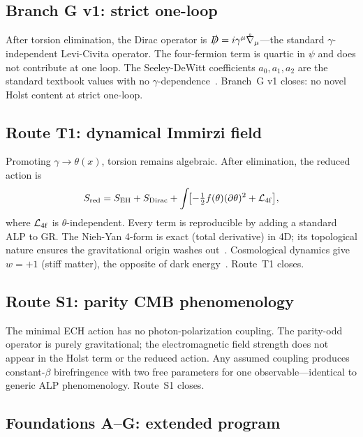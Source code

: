 \documentclass[aps,prd,twocolumn,superscriptaddress,showpacs,preprintnumbers,
  nofootinbib,longbibliography,floatfix]{revtex4-2}
\newcommand{\BI}{\gamma}
\begin{document}
\subsection{Branch G v1: strict one-loop}\label{sec:branchG}

After torsion elimination, the Dirac operator is
$\slashed{D} = i\gamma^\mu\mathring\nabla_\mu$---the standard
$\BI$-independent Levi-Civita operator. The four-fermion term is quartic
in $\psi$ and does not contribute at one loop. The Seeley-DeWitt
coefficients $a_0, a_1, a_2$ are the standard textbook values with no
$\BI$-dependence~\cite{Vassilevich2003}. Branch~G v1 closes: no novel
Holst content at strict one-loop.

\subsection{Route T1: dynamical Immirzi field}\label{sec:T1}

Promoting $\BI \to \theta(x)$, torsion remains algebraic. After
elimination, the reduced action is~\cite{CalcagniMercuri2009,Mercuri2009}
\begin{equation}\label{eq:T1red}
  S_{\rm red} = S_{\rm EH} + S_{\rm Dirac}
  + \int\!\bigl[-\tfrac{1}{2}f(\theta)(\partial\theta)^2
    + \mathcal{L}_{\rm 4f}\bigr],
\end{equation}
where $\mathcal{L}_{\rm 4f}$ is $\theta$-independent. Every term is
reproducible by adding a standard ALP to GR. The Nieh-Yan 4-form is
exact (total derivative) in 4D; its topological nature ensures the
gravitational origin washes out~\cite{CalcagniMercuri2009}. Cosmological
dynamics give $w = +1$ (stiff matter), the opposite of dark
energy~\cite{TaverasYunes2008}. Route~T1 closes.

\subsection{Route S1: parity CMB phenomenology}\label{sec:S1}

The minimal ECH action has no photon-polarization coupling. The
parity-odd operator is purely gravitational; the electromagnetic field
strength does not appear in the Holst term or the reduced action. Any
assumed coupling produces constant-$\beta$ birefringence with two free
parameters for one observable---identical to generic ALP phenomenology.
Route~S1 closes.

\subsection{Foundations A--G: extended program}\label{sec:foundations}
\end{document}
